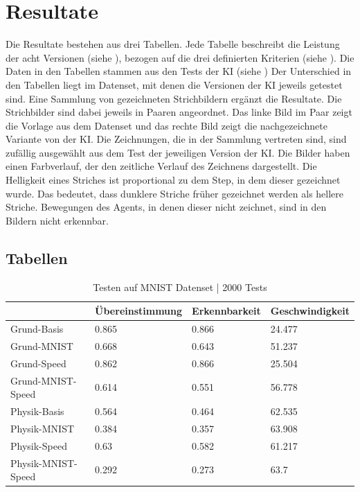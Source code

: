 \chapter{Resultate}
\label{chap:r}
Die Resultate bestehen aus drei Tabellen. Jede Tabelle beschreibt die Leistung
der acht Versionen (siehe ), bezogen auf die drei definierten
Kriterien (siehe ). Die Daten in den Tabellen
stammen aus den Tests der KI (siehe )
Der Unterschied in den Tabellen liegt im Datenset, mit denen die Versionen der
KI jeweils getestet sind. 
Eine Sammlung von gezeichneten Strichbildern ergänzt die Resultate. Die
Strichbilder sind dabei jeweils in Paaren angeordnet. Das linke Bild im Paar
zeigt die Vorlage aus dem Datenset und das rechte Bild zeigt die nachgezeichnete
Variante von der KI. Die Zeichnungen, die in der Sammlung
vertreten sind, sind zufällig ausgewählt aus dem Test der jeweiligen Version der
KI. Die Bilder haben einen Farbverlauf, der den zeitliche
Verlauf des Zeichnens dargestellt. Die Helligkeit eines Striches ist
proportional zu dem Step, in dem dieser gezeichnet wurde. Das bedeutet, dass
dunklere Striche früher gezeichnet werden als hellere Striche. Bewegungen des
Agents, in denen dieser nicht zeichnet, sind in den Bildern nicht erkennbar.

\newpage
\section{Tabellen}
\label{sub:r_tab}
\begin{table}[!ht]
    \centering
    \caption{Testen auf MNIST Datenset | 2000 Tests}
    \begin{tabular}{|l|l|l|l|}
        \hline
            ~ & Übereinstimmung  & Erkennbarkeit  & Geschwindigkeit \\ \hline
            Grund-Basis & 0.865 & 0.866 & 24.477 \\ \hline
            Grund-MNIST & 0.668 & 0.643 & 51.237 \\ \hline
            Grund-Speed & 0.862 & 0.866 & 25.504 \\ \hline
            Grund-MNIST-Speed & 0.614 & 0.551 & 56.778 \\ \hline
            Physik-Basis & 0.564 & 0.464 & 62.535 \\ \hline
            Physik-MNIST & 0.384 & 0.357 & 63.908 \\ \hline
            Physik-Speed & 0.63 & 0.582 & 61.217 \\ \hline
            Physik-MNIST-Speed & 0.292 & 0.273 & 63.7 \\ \hline
        \end{tabular}
    \label{tab:MNIST}
\end{table}

